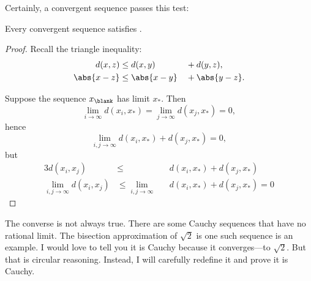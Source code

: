 \documentclass{scrartcl}
\newcommand{\dist}{d}
\begin{document}
Certainly, a convergent sequence passes this test:
\begin{theorem}
  Every convergent sequence satisfies .
\end{theorem}
\begin{proof}
  Recall the triangle inequality:
  \begin{alignat*}{3}
    \dist(x,z)&\leq d(x,y)&&+d(y,z),\\
    \abs{x-z}&\leq \abs{x-y}&&+\abs{y-z}.
  \end{alignat*}

  Suppose the sequence \(x_{\blank}\) has limit \(x_{*}\). Then
  \[
    \lim_{i\to\infty} \dist(x_{i},x_*) = \lim_{j\to\infty} \dist(x_{j},x_{*})=0,
  \]
  hence
  \[
    \lim_{i,j\to\infty} \dist(x_{i},x_{*})+\dist(x_{j},x_{*}) = 0,
  \]
  but
  \begin{alignat*}{3}
    \dist(x_{i},x_{j}) &\leq &&\dist(x_{i},x_{*}) + \dist(x_{j},x_{*}) \\
    \lim_{i,j\to \infty} \dist(x_{i},x_{j}) &\leq \lim_{i,j\to \infty} &&\dist(x_{i},x_{*})+\dist(x_{j},x_{*}) = 0
  \end{alignat*}
\end{proof}
The converse is not always true. There are some Cauchy sequences that have no rational limit. The bisection approximation of \(\sqrt 2\) is one such sequence is an example. I would love to tell you it is Cauchy because it converges---to \(\sqrt 2\). But that is circular reasoning. Instead, I will carefully redefine it and prove it is Cauchy.
\end{document}
